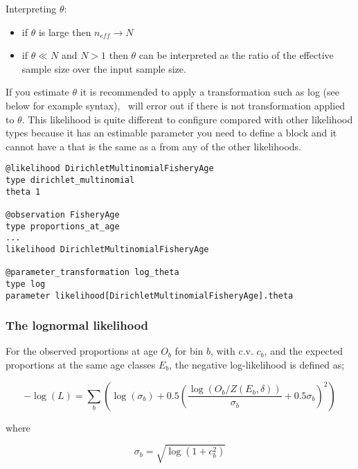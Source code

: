 Interpreting \(\theta\):

\begin{itemize}
	\item if \(\theta\) is large then \(n_{eff} \rightarrow N\)
	\item if \(\theta \ll N \) and \(N > 1\) then \(\theta\) can be interpreted as the ratio of the effective sample size over the input sample size.
\end{itemize}

If you estimate \(\theta\) it is recommended to apply a transformation such as log (see below for example syntax), \CNAME\ will error out if there is not transformation applied to \(\theta\). This likelihood is quite different to configure compared with other likelihood types because it has an estimable parameter you need to define a  block and it cannot have a  that is the same as a  from any of the other likelihoods.

{\small{\begin{verbatim}
@likelihood DirichletMultinomialFisheryAge
type dirichlet_multinomial
theta 1

@observation FisheryAge
type proportions_at_age
...
likelihood DirichletMultinomialFisheryAge

@parameter_transformation log_theta
type log
parameter likelihood[DirichletMultinomialFisheryAge].theta
\end{verbatim}}}


\subsubsection*{The lognormal likelihood}

For the observed proportions at age $O_b$ for bin $b$, with c.v. $c_b$, and the expected proportions at the same age classes $E_b$, the negative log-likelihood is defined as;

\begin{equation}
- \log \left(L \right) = \sum\limits_b \left( \log \left( \sigma_b \right) + 0.5\left( \frac{\log \left(O_b / Z \left(E_b,\delta \right) \right)}{\sigma_b} + 0.5 \sigma_b \right)^2 \right)
\end{equation}

where

\begin{equation}
\sigma_b  = \sqrt{\log \left(1+c_b^2 \right)}
\end{equation}

